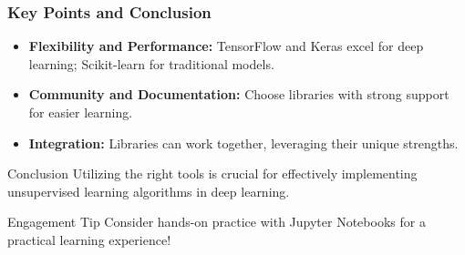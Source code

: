 \documentclass[aspectratio=169]{beamer}
\begin{document}
\begin{frame}[fragile]
    \frametitle{Key Points and Conclusion}
    
    \begin{itemize}
        \item \textbf{Flexibility and Performance:} TensorFlow and Keras excel for deep learning; Scikit-learn for traditional models.
        \item \textbf{Community and Documentation:} Choose libraries with strong support for easier learning.
        \item \textbf{Integration:} Libraries can work together, leveraging their unique strengths.
    \end{itemize}

    \begin{block}{Conclusion}
        Utilizing the right tools is crucial for effectively implementing unsupervised learning algorithms in deep learning.
    \end{block}

    \begin{block}{Engagement Tip}
        Consider hands-on practice with Jupyter Notebooks for a practical learning experience!
    \end{block}
\end{frame}
\end{document}
